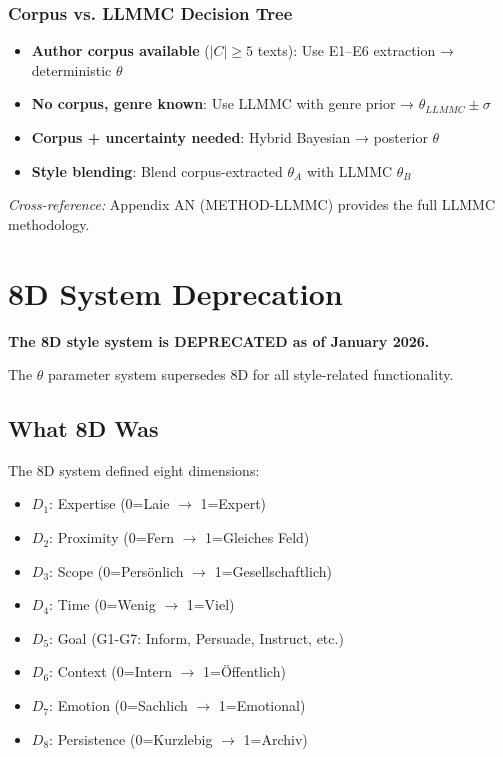 \subsubsection{Corpus vs. LLMMC Decision Tree}

\begin{itemize}
    \item \textbf{Author corpus available} ($|C| \geq 5$ texts): Use E1--E6 extraction → deterministic $\theta$
    \item \textbf{No corpus, genre known}: Use LLMMC with genre prior → $\theta_{LLMMC} \pm \sigma$
    \item \textbf{Corpus + uncertainty needed}: Hybrid Bayesian → posterior $\theta$
    \item \textbf{Style blending}: Blend corpus-extracted $\theta_A$ with LLMMC $\theta_B$
\end{itemize}

\textit{Cross-reference:} Appendix AN (METHOD-LLMMC) provides the full LLMMC methodology.


\section{8D System Deprecation}
\label{sec:sw-deprecation}

\begin{tcolorbox}[colback=red!5!white, colframe=red!75!black, title=⚠️ Deprecation Notice]
\textbf{The 8D style system is DEPRECATED as of January 2026.}

The $\theta$ parameter system supersedes 8D for all style-related functionality.
\end{tcolorbox}

\subsection{What 8D Was}
\label{sec:sw-8d-was}

The 8D system defined eight dimensions:

\begin{itemize}
    \item $D_1$: Expertise (0=Laie $\rightarrow$ 1=Expert)
    \item $D_2$: Proximity (0=Fern $\rightarrow$ 1=Gleiches Feld)
    \item $D_3$: Scope (0=Persönlich $\rightarrow$ 1=Gesellschaftlich)
    \item $D_4$: Time (0=Wenig $\rightarrow$ 1=Viel)
    \item $D_5$: Goal (G1-G7: Inform, Persuade, Instruct, etc.)
    \item $D_6$: Context (0=Intern $\rightarrow$ 1=Öffentlich)
    \item $D_7$: Emotion (0=Sachlich $\rightarrow$ 1=Emotional)
    \item $D_8$: Persistence (0=Kurzlebig $\rightarrow$ 1=Archiv)
\end{itemize}

